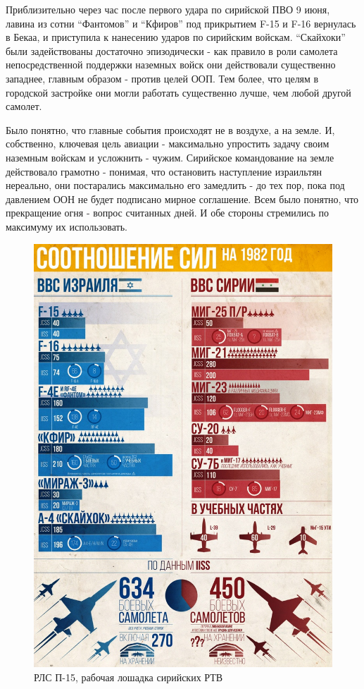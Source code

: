 Приблизительно через час после первого удара по сирийской ПВО 9 июня, лавина из сотни “Фантомов” и “Кфиров” под прикрытием F-15 и F-16 вернулась в Бекаа, и приступила к нанесению ударов по сирийским войскам. “Скайхоки” были задействованы достаточно эпизодически - как правило в роли самолета непосредственной поддержки наземных войск они действовали существенно западнее, главным образом - против целей ООП. Тем более, что целям в городской застройке они могли работать существенно лучше, чем любой другой самолет.

Было понятно, что главные события происходят не в воздухе, а на земле. И, собственно, ключевая цель авиации - максимально упростить задачу своим наземным войскам и усложнить - чужим. Сирийское командование на земле действовало грамотно - понимая, что остановить наступление израильтян нереально, они постарались максимально его замедлить - до тех пор, пока под давлением ООН не будет подписано мирное соглашение. Всем было понятно, что прекращение огня - вопрос считанных дней. И обе стороны стремились по максимуму их использовать.

\begin{figure}[h!tb] 
	\centering\includegraphics[scale=0.5]{Bekaa_3/BRm_1jpZcUs.jpg}
	\caption{РЛС П-15, рабочая лошадка сирийских РТВ}%
\end{figure}

